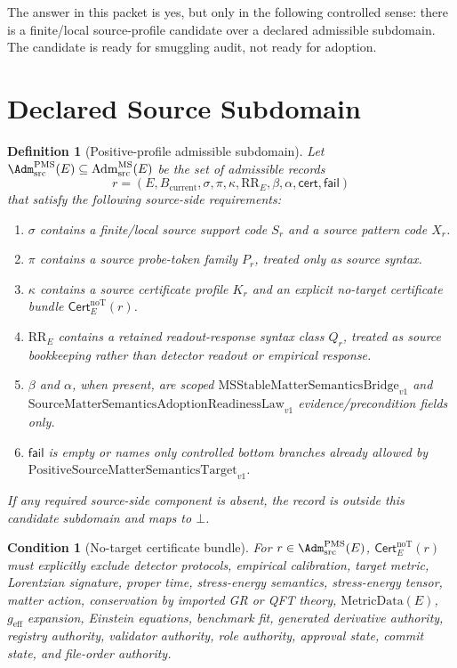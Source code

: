\documentclass[11pt]{article}
\newcommand{\Bcur}{B_{\mathrm{current}}}
\newcommand{\MSBridge}{\mathrm{MSStableMatterSemanticsBridge}_{v1}}
\newcommand{\SMSAR}{\mathrm{SourceMatterSemanticsAdoptionReadinessLaw}_{v1}}
\newcommand{\PMSTarget}{\mathrm{PositiveSourceMatterSemanticsTarget}_{v1}}
\newcommand{\AdmSrc}{\mathrm{Adm}^{\mathrm{MS}}_{\mathrm{src}}}
\newcommand{\Bottom}{\bot}
\newcommand{\RRE}{\mathrm{RR}_E}
\newcommand{\MetricData}{\mathrm{MetricData}}
\newcommand{\geff}{g_{\mathrm{eff}}}
\newcommand{\Cert}{\mathsf{Cert}^{\mathrm{noT}}_E}
\newtheorem{definition}{Definition}
\newtheorem{condition}{Condition}
\begin{document}
The answer in this packet is yes, but only in the following controlled sense:
there is a finite/local source-profile candidate over a declared admissible
subdomain. The candidate is ready for smuggling audit, not ready for adoption.

\section{Declared Source Subdomain}

\begin{definition}[Positive-profile admissible subdomain]
Let \(\Adm^{\mathrm{PMS}}_{\mathrm{src}}(E)\subseteq\AdmSrc(E)\) be the set
of admissible records
\[
  r=(E,\Bcur,\sigma,\pi,\kappa,\RRE,\beta,\alpha,\mathsf{cert},
      \mathsf{fail})
\]
that satisfy the following source-side requirements:
\begin{enumerate}[label=D\arabic*.,leftmargin=*]
  \item \(\sigma\) contains a finite/local source support code
  \(S_r\) and a source pattern code \(X_r\).
  \item \(\pi\) contains a source probe-token family \(P_r\), treated only as
  source syntax.
  \item \(\kappa\) contains a source certificate profile \(K_r\) and an
  explicit no-target certificate bundle \(\Cert(r)\).
  \item \(\RRE\) contains a retained readout-response syntax class
  \(Q_r\), treated as source bookkeeping rather than detector readout or
  empirical response.
  \item \(\beta\) and \(\alpha\), when present, are scoped
  \(\MSBridge\) and \(\SMSAR\) evidence/precondition fields only.
  \item \(\mathsf{fail}\) is empty or names only controlled bottom branches
  already allowed by \(\PMSTarget\).
\end{enumerate}
If any required source-side component is absent, the record is outside this
candidate subdomain and maps to \(\Bottom\).
\end{definition}

\begin{condition}[No-target certificate bundle]
For \(r\in\Adm^{\mathrm{PMS}}_{\mathrm{src}}(E)\), \(\Cert(r)\) must
explicitly exclude detector protocols, empirical calibration, target metric,
Lorentzian signature, proper time, stress-energy semantics, stress-energy
tensor, matter action, conservation by imported GR or QFT theory,
\(\MetricData(E)\), \(\geff\) expansion, Einstein equations, benchmark fit,
generated derivative authority, registry authority, validator authority, role
authority, approval state, commit state, and file-order authority.
\end{condition}
\end{document}
